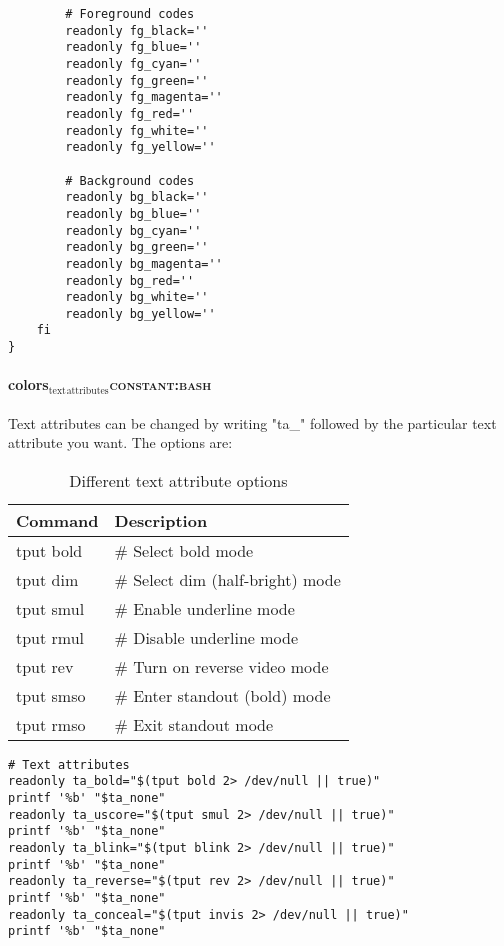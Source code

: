 \documentclass[11pt]{article}
\begin{document}
\begin{verbatim}
        # Foreground codes
        readonly fg_black=''
        readonly fg_blue=''
        readonly fg_cyan=''
        readonly fg_green=''
        readonly fg_magenta=''
        readonly fg_red=''
        readonly fg_white=''
        readonly fg_yellow=''

        # Background codes
        readonly bg_black=''
        readonly bg_blue=''
        readonly bg_cyan=''
        readonly bg_green=''
        readonly bg_magenta=''
        readonly bg_red=''
        readonly bg_white=''
        readonly bg_yellow=''
    fi
}
\end{verbatim}

\paragraph{colors\(_{\text{text}}\)\(_{\text{attributes}}\)\hfill{}\textsc{constant:bash}}
\label{sec:org7417266}

Text attributes can be changed by writing "ta\_" followed by the particular text attribute you want. The options are:

\begin{table}[htbp]
\caption{Different text attribute options}
\centering
\begin{tabular}{ll}
\hline
Command & Description\\
\hline
tput bold & \# Select bold mode\\
tput dim & \# Select dim (half-bright) mode\\
tput smul & \# Enable underline mode\\
tput rmul & \# Disable underline mode\\
tput rev & \# Turn on reverse video mode\\
tput smso & \# Enter standout (bold) mode\\
tput rmso & \# Exit standout mode\\
\hline
\end{tabular}
\end{table}

\begin{verbatim}
# Text attributes
readonly ta_bold="$(tput bold 2> /dev/null || true)"
printf '%b' "$ta_none"
readonly ta_uscore="$(tput smul 2> /dev/null || true)"
printf '%b' "$ta_none"
readonly ta_blink="$(tput blink 2> /dev/null || true)"
printf '%b' "$ta_none"
readonly ta_reverse="$(tput rev 2> /dev/null || true)"
printf '%b' "$ta_none"
readonly ta_conceal="$(tput invis 2> /dev/null || true)"
printf '%b' "$ta_none"
\end{verbatim}
\end{document}
